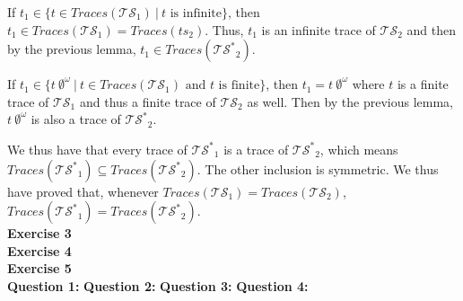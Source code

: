 \documentclass[11pt,a4paper]{article}
\def\exercise#1{\Large\textbf{Exercise #1}\normalsize\\}
\def\question#1{\textbf{Question #1:}\quad}
\def\ts{\mathcal{TS}}
\def\tss{\mathcal{TS^*}}
\def\traces{\mathit{Traces}}
\begin{document}
If $t_1\in\{t\in\traces(\ts_1)~|~t\text{ is infinite}\}$, then $t_1\in\traces(\ts_1)=\traces(ts_2)$. Thus, $t_1$ is an infinite trace of $\ts_2$ and then by the previous lemma, $t_1\in\traces(\tss_2)$.

If $t_1\in\{t\ \emptyset^\omega~|~t\in\traces(\ts_1)\text{ and $t$ is finite}\}$, then $t_1=t\ \emptyset^\omega$ where $t$ is a finite trace of $\ts_1$ and thus a finite trace of $\ts_2$ as well. Then by the previous lemma, $t\ \emptyset^\omega$ is also a trace of $\tss_2$.

We thus have that every trace of $\tss_1$ is a trace of $\tss_2$, which means $\traces(\tss_1)\subseteq\traces(\tss_2)$. The other inclusion is symmetric. We thus have proved that, whenever $\traces(\ts_1)=\traces(\ts_2)$, $\traces(\tss_1)=\traces(\tss_2)$.\\



\exercise{3}

\exercise{4}

\exercise{5}
\question{1}
\question{2}
\question{3}
\question{4}
\end{document}
